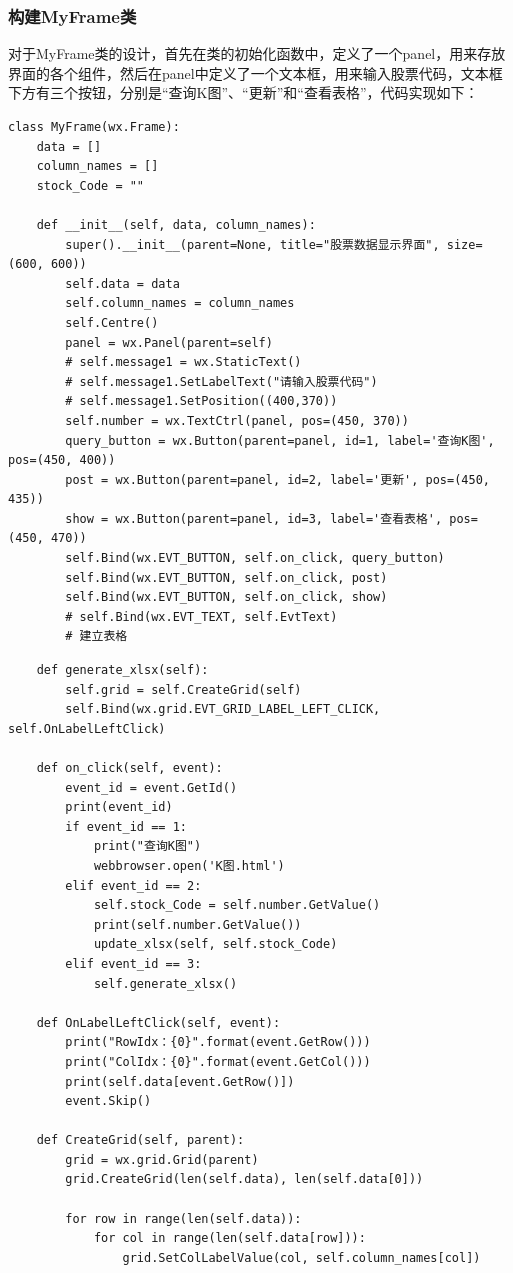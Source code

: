 \documentclass[UTF8,12pt]{article}
\begin{document}
\subsubsection{构建MyFrame类}
对于MyFrame类的设计，首先在类的初始化函数中，定义了一个panel，用来存放界面的各个组件，然后在panel中定义了一个文本框，用来输入股票代码，文本框下方有三个按钮，分别是“查询K图”、“更新”和“查看表格”，代码实现如下：

\begin{lstlisting}
class MyFrame(wx.Frame):
    data = []
    column_names = []
    stock_Code = ""

    def __init__(self, data, column_names):
        super().__init__(parent=None, title="股票数据显示界面", size=(600, 600))
        self.data = data
        self.column_names = column_names
        self.Centre()
        panel = wx.Panel(parent=self)
        # self.message1 = wx.StaticText()
        # self.message1.SetLabelText("请输入股票代码")
        # self.message1.SetPosition((400,370))
        self.number = wx.TextCtrl(panel, pos=(450, 370))
        query_button = wx.Button(parent=panel, id=1, label='查询K图', pos=(450, 400))
        post = wx.Button(parent=panel, id=2, label='更新', pos=(450, 435))
        show = wx.Button(parent=panel, id=3, label='查看表格', pos=(450, 470))
        self.Bind(wx.EVT_BUTTON, self.on_click, query_button)
        self.Bind(wx.EVT_BUTTON, self.on_click, post)
        self.Bind(wx.EVT_BUTTON, self.on_click, show)
        # self.Bind(wx.EVT_TEXT, self.EvtText)
        # 建立表格
\end{lstlisting}

\begin{lstlisting}
    def generate_xlsx(self):
        self.grid = self.CreateGrid(self)
        self.Bind(wx.grid.EVT_GRID_LABEL_LEFT_CLICK, self.OnLabelLeftClick)

    def on_click(self, event):
        event_id = event.GetId()
        print(event_id)
        if event_id == 1:
            print("查询K图")
            webbrowser.open('K图.html')
        elif event_id == 2:
            self.stock_Code = self.number.GetValue()
            print(self.number.GetValue())
            update_xlsx(self, self.stock_Code)
        elif event_id == 3:
            self.generate_xlsx()

    def OnLabelLeftClick(self, event):
        print("RowIdx：{0}".format(event.GetRow()))
        print("ColIdx：{0}".format(event.GetCol()))
        print(self.data[event.GetRow()])
        event.Skip()

    def CreateGrid(self, parent):
        grid = wx.grid.Grid(parent)
        grid.CreateGrid(len(self.data), len(self.data[0]))

        for row in range(len(self.data)):
            for col in range(len(self.data[row])):
                grid.SetColLabelValue(col, self.column_names[col])
\end{lstlisting}
\end{document}
